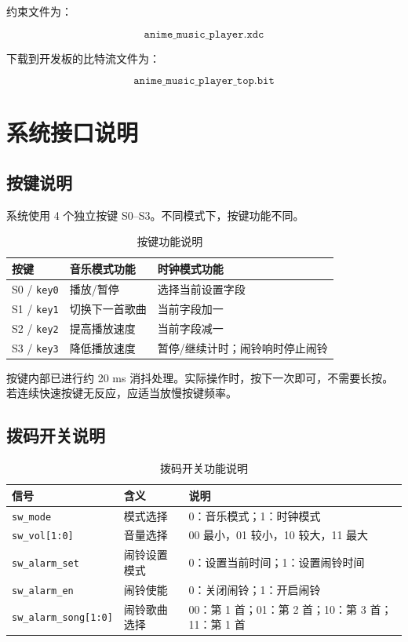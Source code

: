 \documentclass[UTF8,a4paper,12pt]{ctexart}
\newcommand{\port}[1]{\texttt{#1}}
\begin{document}
约束文件为：

\[
\texttt{anime\_music\_player.xdc}
\]

下载到开发板的比特流文件为：

\[
\texttt{anime\_music\_player\_top.bit}
\]

\section{系统接口说明}

\subsection{按键说明}

系统使用 4 个独立按键 S0--S3。不同模式下，按键功能不同。

\begin{table}[H]
  \centering
  \caption{按键功能说明}
  \begin{tabular}{lll}
    \toprule
    按键 & 音乐模式功能 & 时钟模式功能 \\
    \midrule
    S0 / \port{key0} & 播放/暂停 & 选择当前设置字段 \\
    S1 / \port{key1} & 切换下一首歌曲 & 当前字段加一 \\
    S2 / \port{key2} & 提高播放速度 & 当前字段减一 \\
    S3 / \port{key3} & 降低播放速度 & 暂停/继续计时；闹铃响时停止闹铃 \\
    \bottomrule
  \end{tabular}
\end{table}

按键内部已进行约 20 ms 消抖处理。实际操作时，按下一次即可，不需要长按。若连续快速按键无反应，应适当放慢按键频率。

\subsection{拨码开关说明}

\begin{table}[H]
  \centering
  \caption{拨码开关功能说明}
  \begin{tabular}{lll}
    \toprule
    信号 & 含义 & 说明 \\
    \midrule
    \port{sw\_mode} & 模式选择 & 0：音乐模式；1：时钟模式 \\
    \port{sw\_vol[1:0]} & 音量选择 & 00 最小，01 较小，10 较大，11 最大 \\
    \port{sw\_alarm\_set} & 闹铃设置模式 & 0：设置当前时间；1：设置闹铃时间 \\
    \port{sw\_alarm\_en} & 闹铃使能 & 0：关闭闹铃；1：开启闹铃 \\
    \port{sw\_alarm\_song[1:0]} & 闹铃歌曲选择 & 00：第 1 首；01：第 2 首；10：第 3 首；11：第 1 首 \\
    \bottomrule
  \end{tabular}
\end{table}
\end{document}
